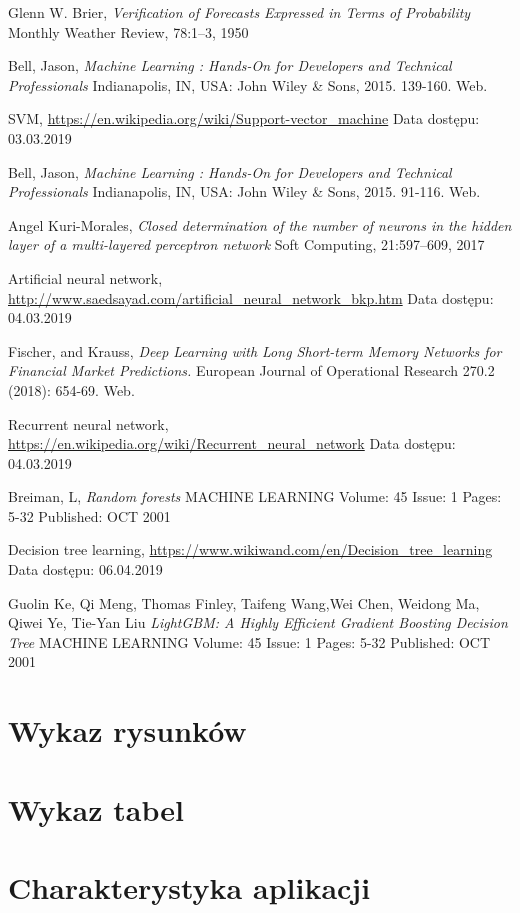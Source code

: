 \documentclass[a4paper, twoside, 11pt, openright]{article}
\begin{document}
\begin{thebibliography}{9}
	Glenn W. Brier, 
  \textit{Verification of Forecasts Expressed in Terms of Probability}
  Monthly Weather Review, 78:1–3, 1950
  
	Bell, Jason, \textit{Machine Learning : Hands-On for Developers and Technical Professionals}  Indianapolis, IN, USA: John Wiley \& Sons, 2015. 139-160. Web.
	
	SVM, \url{https://en.wikipedia.org/wiki/Support-vector_machine} 
	Data dostępu: 03.03.2019

	Bell, Jason, \textit{Machine Learning : Hands-On for Developers and Technical Professionals}  Indianapolis, IN, USA: John Wiley \& Sons, 2015. 91-116. Web.


	Angel Kuri-Morales, 
  \textit{Closed determination of the number of neurons in the hidden layer of a multi-layered perceptron network}
  Soft Computing, 21:597–609, 2017

	Artificial neural network, \url{http://www.saedsayad.com/artificial_neural_network_bkp.htm} 
	Data dostępu: 04.03.2019

	Fischer, and Krauss, 
  \textit{Deep Learning with Long Short-term Memory Networks for Financial Market Predictions.}
  European Journal of Operational Research 270.2 (2018): 654-69. Web.

	Recurrent neural network, \url{https://en.wikipedia.org/wiki/Recurrent_neural_network} 
	Data dostępu: 04.03.2019

	Breiman, L, 
  \textit{Random forests}
	MACHINE LEARNING  Volume: 45   Issue: 1   Pages: 5-32   Published: OCT 2001


	Decision tree learning, \url{https://www.wikiwand.com/en/Decision_tree_learning} 
	Data dostępu: 06.04.2019


Guolin Ke, Qi Meng, Thomas Finley, Taifeng Wang,Wei Chen, Weidong Ma, Qiwei Ye, Tie-Yan Liu
  \textit{LightGBM: A Highly Efficient Gradient Boosting Decision Tree}
	MACHINE LEARNING  Volume: 45   Issue: 1   Pages: 5-32   Published: OCT 2001



\end{thebibliography}

\newpage

\section{Wykaz rysunków}

\newpage

\section{Wykaz tabel}

\newpage

\section{Charakterystyka aplikacji}
\end{document}

